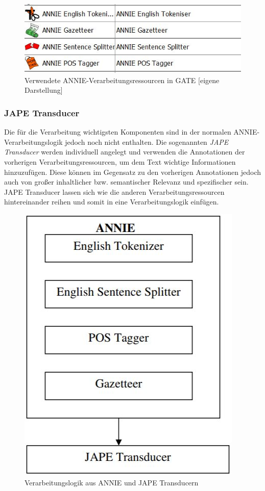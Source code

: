 \documentclass[12pt]{report}
\begin{document}
\begin{figure}[H]
\begin{center}
\includegraphics[scale=0.9]{Bilder/ANNIEinGATE.jpg}
\caption{Verwendete ANNIE-Verarbeitungsressourcen in GATE [eigene Darstellung]}
\end{center}
\end{figure}   

\subsubsection{JAPE Transducer}
Die für die Verarbeitung wichtigsten Komponenten sind in der normalen ANNIE-Verarbeitungslogik jedoch noch nicht enthalten. Die sogenannten \textit{JAPE Transducer} werden individuell angelegt und verwenden die Annotationen der vorherigen Verarbeitungsressourcen, um dem Text wichtige Informationen hinzuzufügen. Diese können im Gegensatz zu den vorherigen Annotationen jedoch auch von großer inhaltlicher bzw. semantischer Relevanz und spezifischer sein. JAPE Transducer lassen sich wie die anderen Verarbeitungsressourcen hintereinander reihen und somit in eine Verarbeitungslogik einfügen.

\begin{figure}[H]
\begin{center}
\includegraphics[scale=0.7]{Bilder/ANNIE-Pipeline.jpg}
\caption{Verarbeitungslogik aus ANNIE und JAPE Transducern \cite{tol09}}
\end{center}
\end{figure}   
\end{document}
